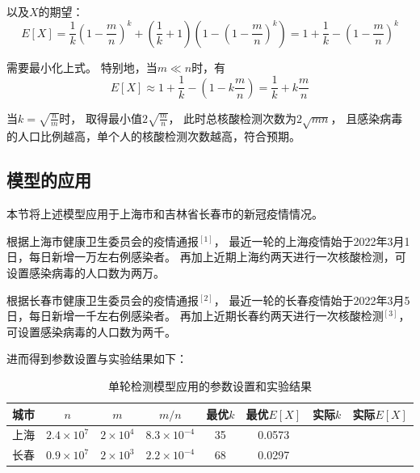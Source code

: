 \documentclass[12pt]{article}
\begin{document}
以及$X$的期望：
\begin{equation*}
E[X]
= \frac{1}{k} (1 - \frac{m}{n})^k + 
(\frac{1}{k} + 1)(1 - (1 - \frac{m}{n})^k)
= 1 + \frac{1}{k} - (1 - \frac{m}{n})^k
\end{equation*}

需要最小化上式。
特别地，当$ m \ll n $时，有
\begin{equation*}
E[X] \approx 1 + \frac{1}{k} - (1 - k\frac{m}{n})
= \frac{1}{k} + k\frac{m}{n}
\end{equation*}

当$ k = \sqrt{\frac{n}{m}} $时，
取得最小值$2\sqrt{\frac{m}{n}}$，
此时总核酸检测次数为$2\sqrt{mn}$，
且感染病毒的人口比例越高，单个人的核酸检测次数越高，符合预期。

\subsection{模型的应用}

本节将上述模型应用于上海市和吉林省长春市的新冠疫情情况。

根据上海市健康卫生委员会的疫情通报$^{[1]}$，
最近一轮的上海疫情始于2022年3月1日，每日新增一万左右例感染者。
再加上近期上海约两天进行一次核酸检测，可设置感染病毒的人口数为两万。

根据长春市健康卫生委员会的疫情通报$^{[2]}$，
最近一轮的长春疫情始于2022年3月5日，每日新增一千左右例感染者。
再加上近期长春约两天进行一次核酸检测$^{[3]}$，
可设置感染病毒的人口数为两千。

进而得到参数设置与实验结果如下：

\begin{table}[h]
\centering
\begin{tabular}{|c|c|c|c|c|c|c|c|} 
\hline
城市 & $n$ & $m$ & $ m / n $ & 
最优$k$ & 最优$E[X]$ & 
实际$k$ & 实际$E[X]$ \\
\hline
上海 & $ 2.4 \times 10^7 $ 
& $ 2 \times 10^4 $ & $ 8.3 \times 10^{-4} $ 
& 35 & 0.0573 
&  &  \\
长春 & $ 0.9 \times 10^7 $
& $ 2 \times 10^3 $ & $ 2.2 \times 10^{-4} $ 
& 68 & 0.0297 
&  &  \\
\hline
\end{tabular}
\caption{单轮检测模型应用的参数设置和实验结果}
\end{table}
\end{document}
